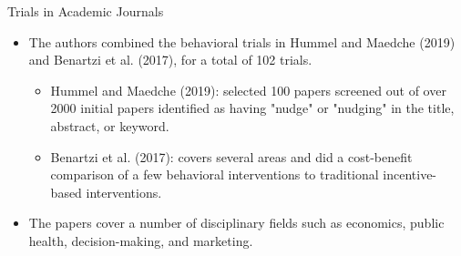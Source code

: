 \documentclass[dvipdfmx,11pt]{beamer}
\begin{document}
\begin{frame}{Trials in Academic Journals}
  \begin{itemize}
    \item The authors combined the behavioral trials in Hummel and Maedche (2019) and Benartzi et al. (2017), for a total of 102 trials.
    \begin{itemize}
      \item Hummel and Maedche (2019): selected 100 papers screened out of over 2000 initial papers identified as having "nudge" or "nudging" in the title, abstract, or keyword.
      \item Benartzi et al. (2017): covers several areas and did a cost-benefit comparison of a few behavioral interventions to traditional incentive-based interventions.
    \end{itemize}
    \item The papers cover a number of disciplinary fields such as economics, public health, decision-making, and marketing.
  \end{itemize}
\end{frame}
\end{document}
